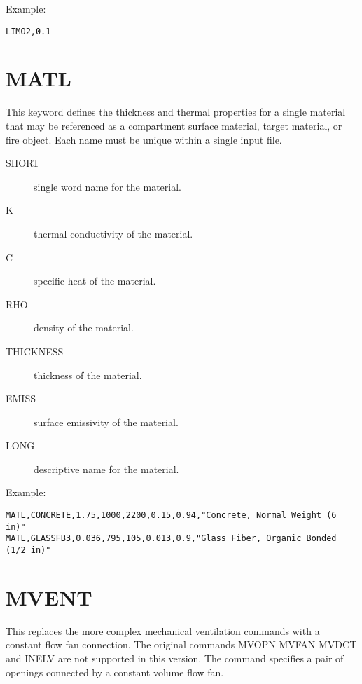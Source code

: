 \noindent Example:

\begin{lstlisting}
LIMO2,0.1
\end{lstlisting}

\section{MATL}

This keyword defines the thickness and thermal properties for a single material that may be referenced as a compartment surface material, target material, or fire object. Each name must be unique within a single input file.

\begin{adjustwidth}{1cm}{0cm}
\begin{description}
  \item[SHORT] single word name for the material.
  \item[K] thermal conductivity of the material.
  \item[C] specific heat of the material.
  \item[RHO] density of the material.
  \item[THICKNESS] thickness of the material.
  \item[EMISS] surface emissivity of the material.
  \item[LONG] descriptive name for the material.
\end{description}
\end{adjustwidth}

\noindent Example:

\begin{lstlisting}
MATL,CONCRETE,1.75,1000,2200,0.15,0.94,"Concrete, Normal Weight (6 in)"
MATL,GLASSFB3,0.036,795,105,0.013,0.9,"Glass Fiber, Organic Bonded (1/2 in)"
\end{lstlisting}

\section{MVENT}

This replaces the more complex mechanical ventilation commands with a constant flow fan connection.  The original commands MVOPN MVFAN MVDCT and INELV are not supported in this version. The command specifies a pair of openings connected by a constant volume flow fan.

